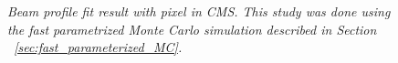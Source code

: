 \documentclass{cmspaper}
\begin{document}
\begin{figure}[hbtp]
  \begin{center}
    \caption{\it Beam profile fit result with pixel in CMS. This study was done using the fast parametrized Monte 
Carlo simulation described in Section ~\ref{sec:fast_parameterized_MC}.}
    \label{fig:beamprofile}
  \end{center}
\end{figure}
\end{document}
